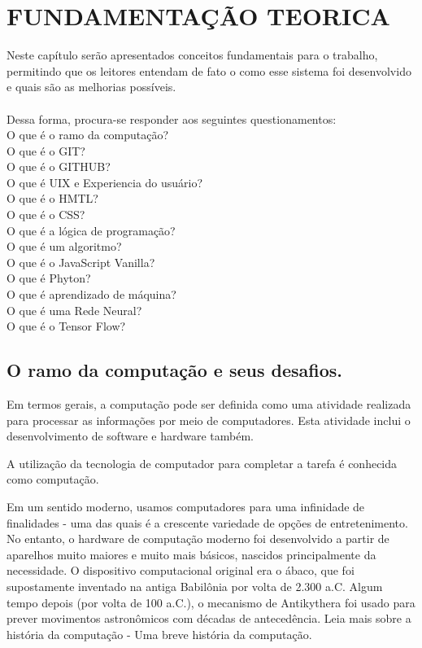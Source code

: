 
\chapter{FUNDAMENTAÇÃO TEORICA}
\label{chap:delimitacao}

Neste capítulo serão apresentados conceitos fundamentais para o trabalho, permitindo que os leitores entendam de fato o como esse sistema foi desenvolvido e quais são as melhorias possíveis.\\
\\
Dessa forma, procura-se responder aos seguintes questionamentos:\\
O que é o ramo da computação?\\
O que é o GIT?\\
O que é o GITHUB?\\ 
O que é UIX e Experiencia do usuário?\\ 
O que é o HMTL?\\
O que é o CSS?\\
O que é a lógica de programação?\\ 
O que é um algoritmo?\\
O que é o JavaScript Vanilla?\\
O que é Phyton?\\
O que é aprendizado de máquina?\\
O que é uma Rede Neural?\\
O que é o Tensor Flow? 

\section{O ramo da computação e seus desafios.}
\label{sec:RamoComputacaoDesafios}
Em termos gerais, a computação pode ser definida como uma atividade realizada para processar as informações por meio de computadores. Esta atividade inclui o desenvolvimento de software e hardware também.

A utilização da tecnologia de computador para completar a tarefa é conhecida como computação.

Em um sentido moderno, usamos computadores para uma infinidade de finalidades - uma das quais é a crescente variedade de opções de entretenimento. No entanto, o hardware de computação moderno foi desenvolvido a partir de aparelhos muito maiores e muito mais básicos, nascidos principalmente da necessidade. O dispositivo computacional original era o ábaco, que foi supostamente inventado na antiga Babilônia por volta de 2.300 a.C. Algum tempo depois (por volta de 100 a.C.), o mecanismo de Antikythera foi usado para prever movimentos astronômicos com décadas de antecedência. Leia mais sobre a história da computação - Uma breve história da computação. 

